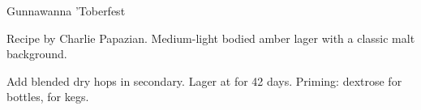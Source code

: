 \begin{recipe}{Gunnawanna 'Toberfest} %

\begin{aboutblock}
Recipe by Charlie Papazian. Medium-light bodied amber lager with a classic malt
background. 
\end{aboutblock}


\begin{methodandtiming}

\begin{mashsteps}
\end{mashsteps}

\begin{fermentationsteps}
\end{fermentationsteps}

\begin{directions}
Add blended dry hops in secondary. Lager at  for 42 days. Priming: 
dextrose for bottles,  for kegs. 
\end{directions}

\end{methodandtiming}

\recipebreak

\begin{ingredientsblock}

\begin{malts}
\end{malts}

\begin{hops}
\end{hops}


\end{ingredientsblock}

\end{recipe}

